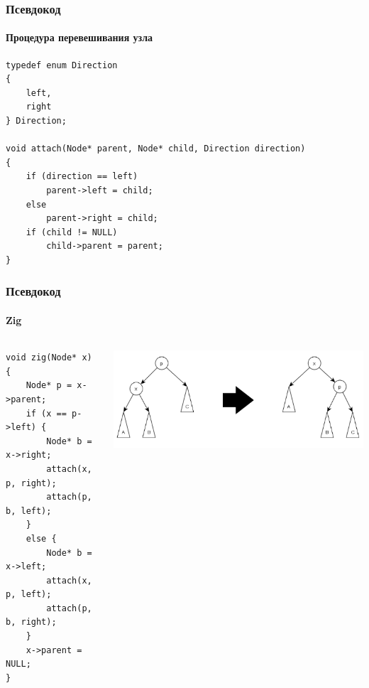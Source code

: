 \documentclass[xetex,mathserif,serif]{beamer}
\begin{document}
    \begin{frame}[fragile]
        \frametitle{Псевдокод}
        \framesubtitle{Процедура перевешивания узла}
        \begin{verbatim}
typedef enum Direction
{
    left,
    right
} Direction;

void attach(Node* parent, Node* child, Direction direction)
{
    if (direction == left)
        parent->left = child;
    else
        parent->right = child;
    if (child != NULL)
        child->parent = parent;
}
        \end{verbatim}
    \end{frame}

    \begin{frame}[fragile]
        \frametitle{Псевдокод}
        \framesubtitle{Zig}
        \begin{columns}
            \begin{column}{0.5\textwidth}
                \begin{verbatim}
void zig(Node* x)
{
    Node* p = x->parent;
    if (x == p->left) {
        Node* b = x->right;
        attach(x, p, right);
        attach(p, b, left);
    }
    else {
        Node* b = x->left;
        attach(x, p, left);
        attach(p, b, right);
    }
    x->parent = NULL;
}
                \end{verbatim}
            \end{column}
            \begin{column}{0.5\textwidth}
                \begin{center}
                    \includegraphics[width=\textwidth]{zig.png}
                \end{center}
            \end{column}
        \end{columns}
    \end{frame}
\end{document}
